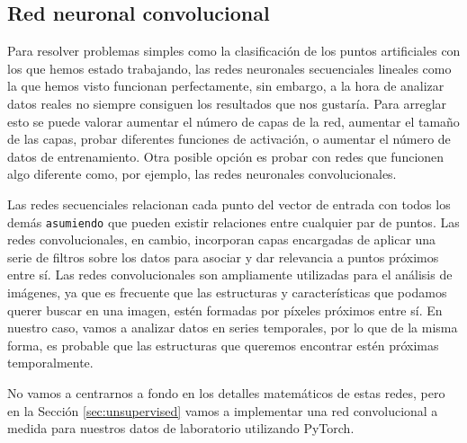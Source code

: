 \subsection{Red neuronal convolucional}
Para resolver problemas simples como la clasificación de los puntos artificiales con los que hemos estado trabajando, las redes neuronales secuenciales lineales como la que hemos visto funcionan perfectamente, sin embargo, a la hora de analizar datos reales no siempre consiguen los resultados que nos gustaría. Para arreglar esto se puede valorar aumentar el número de capas de la red, aumentar el tamaño de las capas, probar diferentes funciones de activación, o aumentar el número de datos de entrenamiento. Otra posible opción es probar con redes que funcionen algo diferente como, por ejemplo, las redes neuronales convolucionales.

Las redes secuenciales relacionan cada punto del vector de entrada con todos los demás \texttt{asumiendo} que pueden existir relaciones entre cualquier par de puntos. Las redes convolucionales, en cambio, incorporan capas encargadas de aplicar una serie de filtros sobre los datos para asociar y dar relevancia a puntos próximos entre sí. Las redes convolucionales son ampliamente utilizadas para el análisis de imágenes, ya que es frecuente que las estructuras y características que podamos querer buscar en una imagen, estén formadas por píxeles próximos entre sí. En nuestro caso, vamos a analizar datos en series temporales, por lo que de la misma forma, es probable que las estructuras que queremos encontrar estén próximas temporalmente.

No vamos a centrarnos a fondo en los detalles matemáticos de estas redes, pero en la Sección \ref{sec:unsupervised} vamos a implementar una red convolucional a medida para nuestros datos de laboratorio utilizando PyTorch.